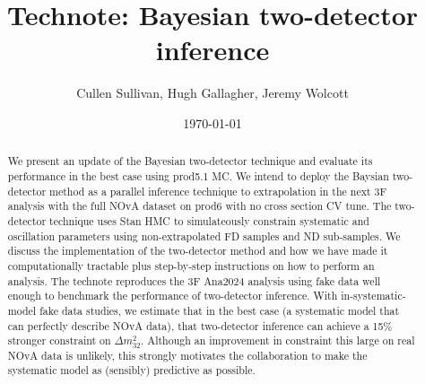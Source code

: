 \documentclass{article}
\title{Technote: Bayesian two-detector inference}
\author{Cullen Sullivan, Hugh Gallagher, Jeremy Wolcott}
\date{\today}
\begin{document}
\newcommand{\dcp}{\ensuremath{\delta_\mathrm{CP}}\xspace}
\newcommand{\dmsq}[1]{\ensuremath{\Delta m^2_{#1}}\xspace}
\renewcommand{\th}[1]{\ensuremath{\theta_{#1}}\xspace}

\maketitle

\begin{abstract}
  We present an update of the Bayesian two-detector technique and evaluate its performance in the best case using prod5.1 MC. We intend to deploy the Baysian two-detector method as a parallel inference technique to extrapolation in the next 3F analysis with the full NOvA dataset on prod6 with no cross section CV tune. The two-detector technique uses Stan HMC to simulateously constrain systematic and oscillation parameters using non-extrapolated FD samples and ND sub-samples. We discuss the implementation of the two-detector method and how we have made it computationally tractable plus step-by-step instructions on how to perform an analysis. The technote reproduces the 3F Ana2024 analysis using fake data well enough to benchmark the performance of two-detector inference. With in-systematic-model fake data studies, we estimate that in the best case (a systematic model that can perfectly describe NOvA data), that two-detector inference can achieve a 15\% stronger constraint on \dmsq{32}. Although an improvement in constraint this large on real NOvA data is unlikely, this strongly motivates the collaboration to make the systematic model as (sensibly) predictive as possible.
\end{abstract}
\end{document}
